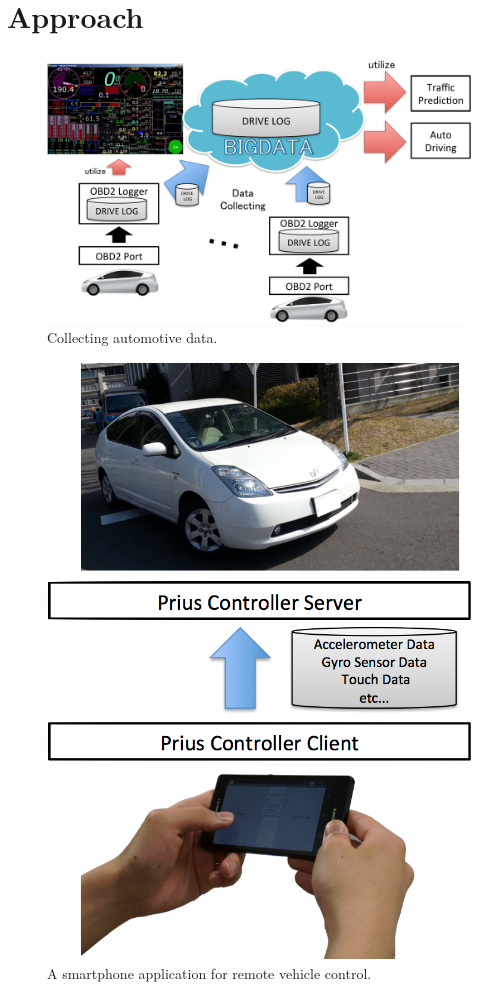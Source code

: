 \section{Approach}
\label{sec:approach}

\begin{figure}[!t]
 \centering
 \includegraphics[width=\hsize]{fig/OBD2.pdf}
 \caption{Collecting automotive data.}
 \label{fig:obd2}
\end{figure}

\begin{figure}[!t]
 \centering
 \includegraphics[width=0.75\hsize]{fig/Andrive.pdf}
 \caption{A smartphone application for remote vehicle control.}
 \label{fig:andrive}
\end{figure}

